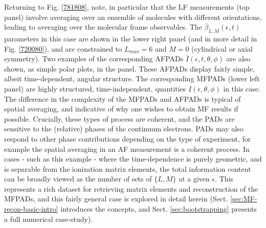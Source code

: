 \documentclass[10pt]{article}
\begin{document}

Returning to Fig. \ref{781808}, note, in particular that the LF measurements (top panel) involve averaging over an ensemble of molecules with different orientations, leading to averaging over the molecular frame observables. The $\bar{\beta}_{L,M}(\epsilon,t)$ parameters in this case are shown in the lower right panel (and in more detail in Fig. \ref{720080}), and are constrained to $L_{max}=6$ and $M=0$ (cylindrical or axial symmetry). Two examples of the corresponding AFPADs $\bar{I}(\epsilon,t,\theta,\phi)$ are also shown, as simple polar plots, in the panel. These AFPADs display fairly simple, albeit time-dependent, angular structure. 
The corresponding MFPADs (lower left panel) are highly structured,  time-independent, quantities $I(\epsilon,\theta,\phi)$ in this case. The difference in the complexity of the MFPADs and AFPADs is typical of spatial averaging, and indicative of why one wishes to obtain MF results if possible. Crucially, these types of process are coherent, and the PADs are sensitive to the (relative) phases of the continuum electrons. PADs may also respond to other phase contributions depending on the type of experiment, for example the spatial averaging in an AF measurement is a coherent process.
In cases - such as this example - where the time-dependence is purely geometric, and is separable from the ionization matrix elements, the total information content can be broadly viewed as the number of sets of $\{L,M\}$ at a given $\epsilon$. 
This represents a rich dataset for retrieving matrix elements and reconstruction of the MFPADs, and this fairly general case is explored in detail herein (Sect. \ref{sec:MF-recon-basic-intro} introduces the concepts, and Sect. \ref{sec:bootstrapping} presents a full numerical case-study). 
\end{document}
